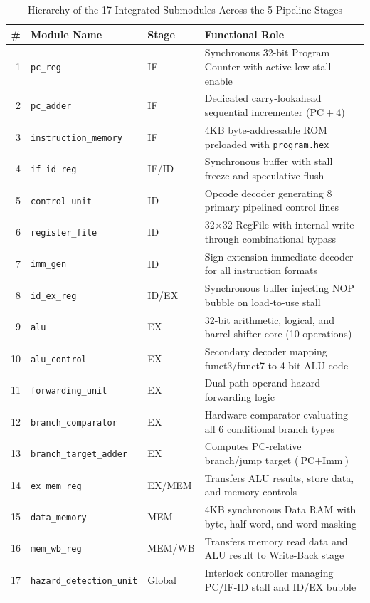 \documentclass[10.5pt,a4paper]{article}
\begin{document}
\begin{table}[htbp]
\centering
\caption{Hierarchy of the 17 Integrated Submodules Across the 5 Pipeline Stages}
\label{tab:submodules}
\scriptsize
\begin{tabular}{rlll}
\toprule
\textbf{\#} & \textbf{Module Name} & \textbf{Stage} & \textbf{Functional Role} \\
\midrule
1  & \texttt{pc\_reg}                 & IF     & Synchronous 32-bit Program Counter with active-low stall enable \\
2  & \texttt{pc\_adder}               & IF     & Dedicated carry-lookahead sequential incrementer ($\text{PC} + 4$) \\
3  & \texttt{instruction\_memory}      & IF     & 4KB byte-addressable ROM preloaded with \texttt{program.hex} \\
4  & \texttt{if\_id\_reg}              & IF/ID  & Synchronous buffer with stall freeze and speculative flush \\
5  & \texttt{control\_unit}            & ID     & Opcode decoder generating 8 primary pipelined control lines \\
6  & \texttt{register\_file}           & ID     & 32$\times$32 RegFile with internal write-through combinational bypass \\
7  & \texttt{imm\_gen}                 & ID     & Sign-extension immediate decoder for all instruction formats \\
8  & \texttt{id\_ex\_reg}              & ID/EX  & Synchronous buffer injecting NOP bubble on load-to-use stall \\
9  & \texttt{alu}                      & EX     & 32-bit arithmetic, logical, and barrel-shifter core (10 operations) \\
10 & \texttt{alu\_control}             & EX     & Secondary decoder mapping funct3/funct7 to 4-bit ALU code \\
11 & \texttt{forwarding\_unit}         & EX     & Dual-path operand hazard forwarding logic \\
12 & \texttt{branch\_comparator}       & EX     & Hardware comparator evaluating all 6 conditional branch types \\
13 & \texttt{branch\_target\_adder}    & EX     & Computes PC-relative branch/jump target ($\text{PC} + \text{Imm}$) \\
14 & \texttt{ex\_mem\_reg}             & EX/MEM & Transfers ALU results, store data, and memory controls \\
15 & \texttt{data\_memory}             & MEM    & 4KB synchronous Data RAM with byte, half-word, and word masking \\
16 & \texttt{mem\_wb\_reg}             & MEM/WB & Transfers memory read data and ALU result to Write-Back stage \\
17 & \texttt{hazard\_detection\_unit}  & Global & Interlock controller managing PC/IF-ID stall and ID/EX bubble \\
\bottomrule
\end{tabular}
\end{table}
\end{document}
